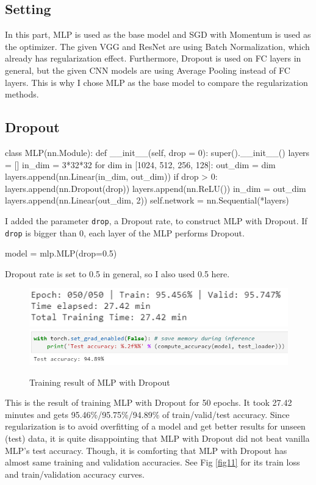 \documentclass[11pt]{article}
\begin{document}
\subsection{Setting}
    In this part, MLP is used as the base model and SGD with Momentum is used as the optimizer. The given VGG and ResNet are using Batch Normalization, which already has regularization effect. Furthermore, Dropout is used on FC layers in general, but the given CNN models are using Average Pooling instead of FC layers. This is why I chose MLP as the base model to compare the regularization methods.

\subsection{Dropout}
\begin{pythoncode*}{}
class MLP(nn.Module):
    def __init__(self, drop = 0):
        super().__init__()
        layers = []
        in_dim = 3*32*32
        for dim in [1024, 512, 256, 128]:
            out_dim = dim
            layers.append(nn.Linear(in_dim, out_dim))
            if drop > 0:
                layers.append(nn.Dropout(drop))
            layers.append(nn.ReLU())
            in_dim = out_dim
        layers.append(nn.Linear(out_dim, 2))
        self.network = nn.Sequential(*layers)
\end{pythoncode*}
    I added the parameter \texttt{drop}, a Dropout rate, to construct MLP with Dropout. If \texttt{drop} is bigger than 0, each layer of the MLP performs Dropout.
\begin{pythoncode*}{}
model = mlp.MLP(drop=0.5)
\end{pythoncode*}
    Dropout rate is set to 0.5 in general, so I also used 0.5 here.
    \begin{figure}[H]
        \includegraphics[width=0.8\linewidth]{img/Dropout/final.PNG}
        \includegraphics[width=1\linewidth]{img/Dropout/test.PNG}
        \caption{Training result of MLP with Dropout}
        \label{fig5}
    \end{figure}
    This is the result of training MLP with Dropout for 50 epochs. It took 27.42 minutes and gets 95.46\%/95.75\%/94.89\% of train/valid/test accuracy. Since regularization is to avoid overfitting of a model and get better results for unseen (test) data, it is quite disappointing that MLP with Dropout did not beat vanilla MLP's test accuracy. Though, it is comforting that MLP with Dropout has almost same training and validation accuracies. See Fig \ref{fig11} for its train loss and train/validation accuracy curves.
    
\end{document}
